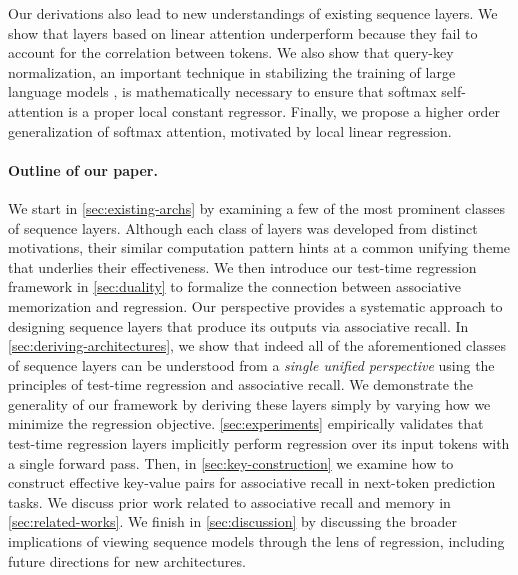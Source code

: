 \documentclass[notitlepage, 11pt]{article}
\begin{document}
Our derivations also lead to new understandings of existing sequence layers.
We show that layers based on linear attention underperform because they fail to account for the correlation between tokens.
We also show that query-key normalization, an important technique in stabilizing the training of large language models \citep{Dehghani2023ScalingVisionTransformers,Wortsman2023SmallscaleProxiesLargescale}, is mathematically necessary to ensure that softmax self-attention is a proper local constant regressor.
Finally, we propose a higher order generalization of softmax attention, motivated by local linear regression.



\paragraph{Outline of our paper.}
We start in \autoref{sec:existing-archs} by examining a few of the most prominent classes of sequence layers.
Although each class of layers was developed from distinct motivations, their similar computation pattern hints at a common unifying theme that underlies their effectiveness.
We then introduce our test-time regression framework in \autoref{sec:duality} to formalize the connection between associative memorization and regression.
Our perspective provides a systematic approach to designing sequence layers that produce its outputs via associative recall.
In \autoref{sec:deriving-architectures}, we show that indeed all of the aforementioned classes of sequence layers can be understood from a \emph{single unified perspective} using the principles of test-time regression and associative recall.
We demonstrate the generality of our framework by deriving these layers simply by varying how we minimize the regression objective.
\autoref{sec:experiments} empirically validates that test-time regression layers implicitly perform regression over its input tokens with a single forward pass.
Then, in \autoref{sec:key-construction} we examine how to construct effective key-value pairs for associative recall in next-token prediction tasks.
We discuss prior work related to associative recall and memory in \autoref{sec:related-works}.
We finish in \autoref{sec:discussion} by discussing the broader implications of viewing sequence models through the lens of regression, including future directions for new architectures.
\end{document}
